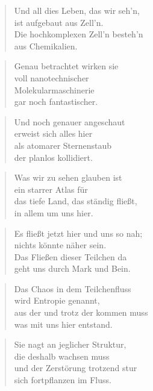 \documentclass[10pt,a4paper]{article}
\begin{document}
\begin{multicols}{2}
\begin{verse}
Und all dies Leben, das wir seh’n, \\
ist aufgebaut aus Zell’n. \\
Die hochkomplexen Zell’n besteh’n \\
aus Chemikalien. \\
\end{verse}

\begin{verse}
Genau betrachtet wirken sie \\
voll nanotechnischer \\
Molekularmaschinerie \\
gar noch fantastischer. \\
\end{verse}

\begin{verse}
Und noch genauer angeschaut \\
erweist sich alles hier \\
als atomarer Sternenstaub \\
der planlos kollidiert. \\
\end{verse}

\begin{verse}
Was wir zu sehen glauben ist \\
ein starrer Atlas für \\
das tiefe Land, das ständig fließt, \\
in allem um uns hier. \\
\end{verse}

\begin{verse}
Es fließt jetzt hier und uns so nah; \\
nichts könnte näher sein. \\
Das Fließen dieser Teilchen da \\
geht uns durch Mark und Bein. \\
\end{verse}

\begin{verse}
Das Chaos in dem Teilchenfluss \\
wird Entropie genannt, \\
aus der und trotz der kommen muss \\
was mit uns hier entstand. \\
\end{verse}

\begin{verse}
Sie nagt an jeglicher Struktur, \\
die deshalb wachsen muss \\
und der Zerstörung trotzend stur \\
sich fortpflanzen im Fluss. \\
\end{verse}


\end{multicols}
\end{document}
